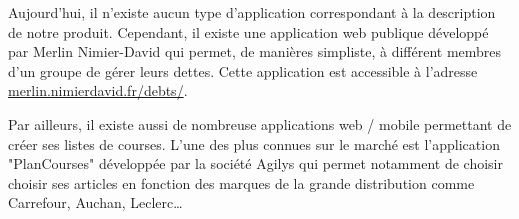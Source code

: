 Aujourd'hui, il n'existe aucun type d'application correspondant à la description de notre produit. Cependant, il existe une application web publique développé par Merlin Nimier-David qui permet, de manières simpliste, à différent membres d'un groupe de gérer leurs dettes. Cette application est accessible à l'adresse \url{merlin.nimierdavid.fr/debts/}.


Par ailleurs, il existe aussi de nombreuse applications web / mobile permettant de créer ses listes de courses. L'une des plus connues sur le marché est l'application "PlanCourses" développée par la société Agilys qui permet notamment de choisir choisir ses articles en fonction des marques de la grande distribution comme Carrefour, Auchan, Leclerc\ldots